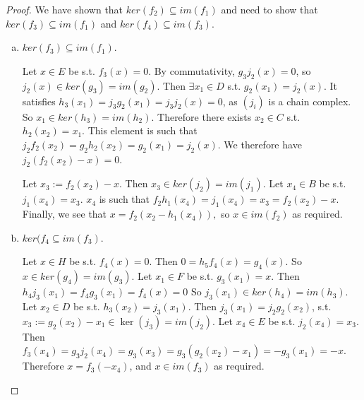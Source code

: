 \begin{proof}
We have shown that $ker(f_2)\subseteq im(f_1)$ and need to show that $ker(f_3)\subseteq im(f_1)$ and $ker(f_4)\subseteq im(f_3)$.

\begin{enumerate}[(a)]
\item $ker(f_3)\subseteq im(f_1)$.

Let $x\in E$ be s.t. $f_3(x)=0$. By commutativity, $g_3j_2(x)=0$, so $j_2(x)\in ker(g_3)=im(g_2)$. Then $\exists x_1\in D$ s.t. $g_2(x_1)=j_2(x)$. It satisfies $h_3(x_1)=j_3g_2(x_1)=j_3j_2(x)=0$, as $(j_i)$ is a chain complex. So $x_1\in ker(h_3)=im(h_2)$. Therefore there exists $x_2\in C$ s.t. $h_2(x_2)=x_1$. This element is such that $j_2f_2(x_2)=g_2h_2(x_2)=g_2(x_1)=j_2(x)$. We therefore have $j_2(f_2(x_2)-x)=0$.

Let $x_3:=f_2(x_2)-x$. Then $x_3\in ker(j_2)=im(j_1)$. Let $x_4\in B$ be s.t. $j_1(x_4)=x_3$. $x_4$ is such that $f_2h_1(x_4)=j_1(x_4)=x_3=f_2(x_2)-x$.
Finally, we see that $x=f_2(x_2-h_1(x_4)),$ so $x\in im(f_2)$ as required.

\item $ker(f_4\subseteq im(f_3)$. 

Let $x\in H$ be s.t. $f_4(x)=0$. Then $0=h_5f_4(x)=g_4(x)$. So $x\in ker(g_4)=im(g_3)$. Let $x_1\in F$ be s.t. $g_3(x_1)=x$. Then $h_4j_3(x_1)=f_4g_3(x_1)=f_4(x)=0$
So $j_3(x_1)\in ker(h_4)=im(h_3)$. Let $x_2\in D$ be s.t. $h_3(x_2)=j_3(x_1)$. Then $j_3(x_1)=j_2g_2(x_2)$, s.t. $x_3:=g_2(x_2)-x_1\in \ker(j_3)=im(j_2)$. Let $x_4\in E$ be s.t. $j_2(x_4)=x_3$. Then $f_3(x_4)=g_3j_2(x_4)=g_3(x_3)=g_3(g_2(x_2)-x_1)=-g_3(x_1)=-x$. Therefore $x=f_3(-x_4)$, and $x\in im(f_3)$ as required.
\end{enumerate}\end{proof}